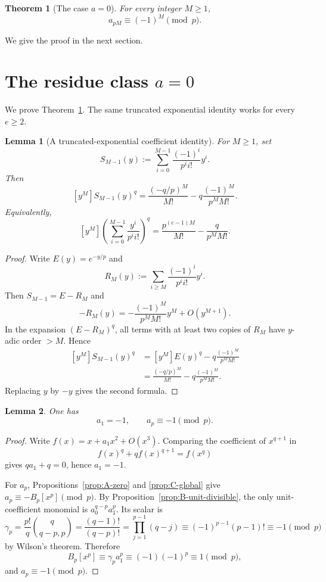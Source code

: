 \documentclass[11pt]{amsart}
\numberwithin{equation}{section}
\newtheorem{theorem}{Theorem}[section]
\newtheorem{lemma}[lemma]{Lemma}
\newcommand{\bigo}{O}
\begin{document}
\begin{theorem}[The case $a=0$]\label{thm:a-zero}
For every integer $M\ge1$,
\[
        a_{pM}\equiv (-1)^M\pmod p.
\]
\end{theorem}
We give the proof in the next section.

\section{The residue class \texorpdfstring{$a=0$}{a=0}}\label{sec:a-zero}
We prove Theorem~\ref{thm:a-zero}.  The same truncated exponential identity works for every $e\ge2$.

\begin{lemma}[A truncated-exponential coefficient identity]\label{lem:trunc-exp}
For $M\ge1$, set
\[
        S_{M-1}(y):=\sum_{i=0}^{M-1}\frac{(-1)^i}{p^ii!}y^i.
\]
Then
\[
        [y^M]S_{M-1}(y)^q
        =\frac{(-q/p)^M}{M!}-q\frac{(-1)^M}{p^M M!}.
\]
Equivalently,
\[
        [y^M]\left(\sum_{i=0}^{M-1}\frac{y^i}{p^ii!}\right)^q
        =\frac{p^{(e-1)M}}{M!}-\frac{q}{p^M M!}.
\]
\end{lemma}
\begin{proof}
Write $E(y)=e^{-y/p}$ and
\[
        R_M(y):=\sum_{i\ge M}\frac{(-1)^i}{p^ii!}y^i.
\]
Then $S_{M-1}=E-R_M$ and
\[
        -R_M(y)=-\frac{(-1)^M}{p^MM!}y^M+\bigo(y^{M+1}).
\]
In the expansion $(E-R_M)^q$, all terms with at least two copies of $R_M$ have $y$-adic order $>M$.  Hence
\[
\begin{aligned}
        [y^M]S_{M-1}(y)^q
        &=[y^M]E(y)^q-q\frac{(-1)^M}{p^MM!}        \\
        &=\frac{(-q/p)^M}{M!}-q\frac{(-1)^M}{p^MM!}.
\end{aligned}
\]
Replacing $y$ by $-y$ gives the second formula.
\end{proof}

\begin{lemma}\label{lem:first-a1-ap}
One has
\[
        a_1=-1,
        \qquad
        a_p\equiv -1\pmod p.
\]
\end{lemma}
\begin{proof}
Write $f(x)=x+a_1x^2+\bigo(x^3)$.  Comparing the coefficient of $x^{q+1}$ in
\[
        f(x)^q+qf(x)^{q+1}=f(x^q)
\]
gives $qa_1+q=0$, hence $a_1=-1$.

For $a_p$, Propositions~\ref{prop:A-zero} and \ref{prop:C-global} give $a_p\equiv -B_p[x^p]\pmod p$.  By Proposition~\ref{prop:B-unit-divisible}, the only unit-coefficient monomial is $a_0^{q-p}a_1^p$.  Its scalar is
\[
        \gamma_p=\frac{p!}{q}\binom{q}{q-p,p}=\frac{(q-1)!}{(q-p)!}=\prod_{j=1}^{p-1}(q-j)
        \equiv (-1)^{p-1}(p-1)!\equiv -1\pmod p
\]
by Wilson's theorem.  Therefore
\[
        B_p[x^p]\equiv \gamma_pa_1^p\equiv (-1)(-1)^p\equiv 1\pmod p,
\]
and $a_p\equiv-1\pmod p$.
\end{proof}
\end{document}
